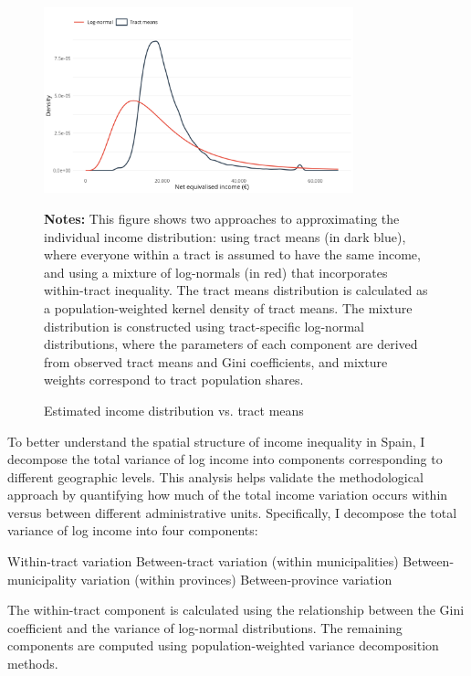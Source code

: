 \begin{figure}[H]
\begin{center}
\captionsetup{justification=centering}
\caption{Estimated income distribution vs. tract means}
\label{fig:distributions}
\includegraphics[width=0.8\textwidth]{output/tract_vs_individual_income_distribution.png}
\end{center}
\begin{fignotes2}
\textbf{Notes:} This figure shows two approaches to approximating the individual income distribution: using tract means (in dark blue), where everyone within a tract is assumed to have the same income, and using a mixture of log-normals (in red) that incorporates within-tract inequality. The tract means distribution is calculated as a population-weighted kernel density of tract means. The mixture distribution is constructed using tract-specific log-normal distributions, where the parameters of each component are derived from observed tract means and Gini coefficients, and mixture weights correspond to tract population shares.
\end{fignotes2}
\end{figure}


To better understand the spatial structure of income inequality in Spain, I decompose the total variance of log income into components corresponding to different geographic levels. This analysis helps validate the methodological approach by quantifying how much of the total income variation occurs within versus between different administrative units.
Specifically, I decompose the total variance of log income into four components:

Within-tract variation
Between-tract variation (within municipalities)
Between-municipality variation (within provinces)
Between-province variation

The within-tract component is calculated using the relationship between the Gini coefficient and the variance of log-normal distributions. The remaining components are computed using population-weighted variance decomposition methods.

